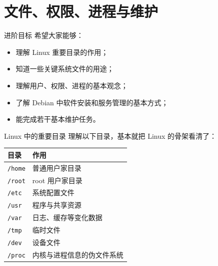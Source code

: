 \documentclass[aspectratio=169]{beamer}
\begin{document}

\section{文件、权限、进程与维护}

\begin{frame}{进阶目标}
希望大家能够：
\begin{itemize}
  \item 理解 Linux 重要目录的作用；
  \item 知道一些关键系统文件的用途；
  \item 理解用户、权限、进程的基本观念；
  \item 了解 Debian 中软件安装和服务管理的基本方式；
  \item 能完成若干基本维护任务。
\end{itemize}
\end{frame}

\begin{frame}{Linux 中的重要目录}
理解以下目录，基本就把 Linux 的骨架看清了：

\begin{center}
\begin{tabular}{ll}
\toprule
目录 & 作用 \\
\midrule
\texttt{/home} & 普通用户家目录 \\
\texttt{/root} & root 用户家目录 \\
\texttt{/etc} & 系统配置文件 \\
\texttt{/usr} & 程序与共享资源 \\
\texttt{/var} & 日志、缓存等变化数据 \\
\texttt{/tmp} & 临时文件 \\
\texttt{/dev} & 设备文件 \\
\texttt{/proc} & 内核与进程信息的伪文件系统 \\
\bottomrule
\end{tabular}
\end{center}
\end{frame}
\end{document}
